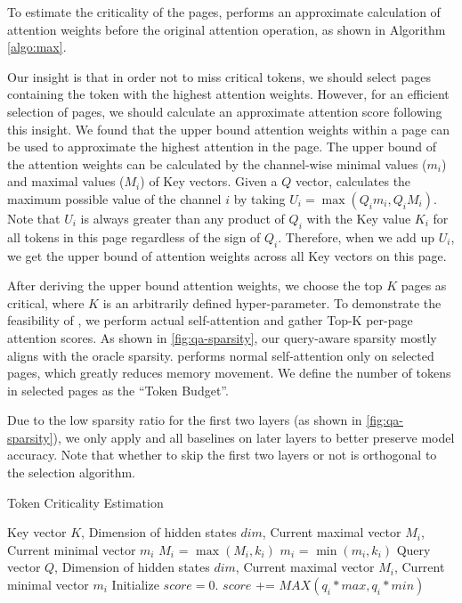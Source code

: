 To estimate the criticality of the pages, \method performs an approximate calculation of attention weights before the original attention operation, as shown in Algorithm \ref{algo:max}.

Our insight is that in order not to miss critical tokens, we should select pages containing the token with the highest attention weights. However, for an efficient selection of pages, we should calculate an approximate attention score following this insight. We found that the upper bound attention weights within a page can be used to approximate the highest attention in the page. The upper bound of the attention weights can be calculated by the channel-wise minimal values ($m_i$) and maximal values ($M_i$) of Key vectors. Given a $Q$ vector, \method calculates the maximum possible value of the channel $i$ by taking $U_i = \max(Q_i m_i, Q_i M_i)$. Note that $U_i$ is always greater than any product of $Q_i$ with the Key value $K_i$ for all tokens in this page regardless of the sign of $Q_i$. Therefore, when we add up $U_i$, we get the upper bound of attention weights across all Key vectors on this page.

After deriving the upper bound attention weights, we choose the top $K$ pages as critical, where $K$ is an arbitrarily defined hyper-parameter. To demonstrate the feasibility of \method, we perform actual self-attention and gather Top-K per-page attention scores. As shown in \fig\ref{fig:qa-sparsity}, our query-aware sparsity mostly aligns with the oracle sparsity. \method performs normal self-attention only on selected pages, which greatly reduces memory movement. We define the number of tokens in selected pages as the ``Token Budget''.

Due to the low sparsity ratio for the first two layers (as shown in \fig\ref{fig:qa-sparsity}), we only apply \method and all baselines on later layers to better preserve model accuracy. Note that whether to skip the first two layers or not is orthogonal to the \kvc{} selection algorithm. 
\begin{algorithm}[h]
   \caption{Token Criticality Estimation}
\begin{algorithmic}
    \label{algo:max}
   
    Key vector $K$, Dimension of hidden states $dim$, Current maximal vector $M_i$, Current minimal vector $m_i$
   \STATE
        \STATE $M_i$ = $\max(M_i, k_{i})$     
        \STATE $m_i$ = $\min(m_i, k_{i})$     
    \ENDFOR
    \STATE
    Query vector $Q$, Dimension of hidden states $dim$, Current maximal vector $M_i$, Current minimal vector $m_i$
   \STATE
   \STATE Initialize $score = 0$.
   \STATE $score$ += $MAX( q_i * max, q_i * min)$
   \ENDFOR
\end{algorithmic}
\end{algorithm}


